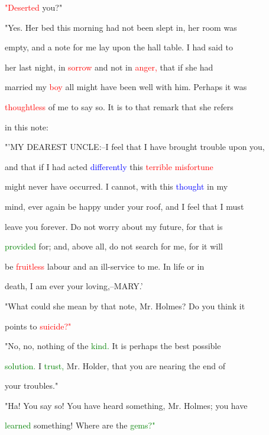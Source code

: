  \textcolor{red}{"Deserted} you?"



 "Yes. Her bed this morning had not been slept in, her room was

 empty, and a note for me lay upon the hall table. I had said to

 her last night, in \textcolor{red}{sorrow} and not in \textcolor{red}{anger,} that if she had

 married my \textcolor{red}{boy} all might have been well with him. Perhaps it was

 \textcolor{red}{thoughtless} of me to say so. It is to that remark that she refers

 in this note:



 "'MY DEAREST UNCLE:--I feel that I have brought trouble upon you,

 and that if I had acted \textcolor{blue}{differently} this \textcolor{red}{terrible} \textcolor{red}{misfortune}

 might never have occurred. I cannot, with this \textcolor{blue}{thought} in my

 mind, ever again be \textcolor{BurntOrange}{happy} under your roof, and I feel that I must

 \textcolor{BurntOrange}{leave} you forever. Do not \textcolor{BurntOrange}{worry} about my future, for that is

 \textcolor{green}{provided} for; and, above all, do not search for me, for it will

 be \textcolor{red}{fruitless} labour and an ill-service to me. In life or in

 \textcolor{BurntOrange}{death,} I am ever your loving,--MARY.'



 "What could she mean by that note, Mr. Holmes? Do you think it

 points to \textcolor{red}{suicide?"}



 "No, no, nothing of the \textcolor{green}{kind.} It is perhaps the best possible

 \textcolor{green}{solution.} I \textcolor{green}{trust,} Mr. Holder, that you are nearing the end of

 your troubles."



 "Ha! You say so! You have heard something, Mr. Holmes; you have

 \textcolor{green}{learned} something! Where are the \textcolor{green}{gems?"}



